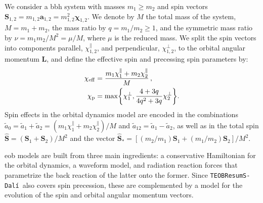 \documentclass[prd,amssymb,amsmath,amsfonts,nofootinbib,reprint,showpacs,longbibliography]{revtex4-1}
\newcommand{\mbf}[1]{\mathbf{#1}}
\newcommand{\dali}[0]{\texttt{TEOBResumS-Dalí}}
\begin{document}
We consider a \ac{bbh} system with masses $m_1 \geq m_2$ and spin vectors $\mbf{S}_{1,2} = m_{1,2} \bm{a}_{1,2} =
m_{1,2}^2 \bm{\chi}_{1,2}$. We denote by $M$ the total mass of the system, $M = m_1 + m_2$, the mass ratio
by $q = m_1/m_2 \geq 1$, and the symmetric mass ratio by $\nu = m_1m_2/M^2 = \mu/M$, where $\mu$ is the reduced
mass. We split the spin vectors into components parallel, $\chi_{1,2}^{\parallel}$, and perpendicular,
$\chi_{1,2}^{\perp}$, to the orbital angular momentum $\bm{L}$, and define the effective spin and precessing spin
parameters by:
\begin{subequations}
\begin{align}
\chi_{\rm eff} &= \frac{m_1 \chi_1^{\parallel} + m_2 \chi_2^{\parallel}}{M} \, , \\
\chi_{\rm p}   &= \max \biggl\{ \chi_1^\perp, \dfrac{4+3q}{4q^2+3q} \chi_2^\perp \biggr\}.
\end{align}
\end{subequations}
Spin effects in the orbital dynamics model are encoded in the combinations $\tilde{a}_0 = \tilde{a}_1 +
\tilde{a}_2 = (m_1\chi_1^\parallel + m_2 \chi_2^\parallel)/M$ and $\tilde{a}_{12} = \tilde{a}_1 - \tilde{a}_2$,
as well as in the total spin $\hat{\bm{S}} = (\bm{S}_1 + \bm{S}_2)/M^2$ and the vector $\hat{\bm{S}}_* = 
\left[(m_2/m_1) \bm{S}_1 + (m_1/m_2) \bm{S}_2\right]/M^2$.

\ac{eob} models are built from three main ingredients: a conservative Hamiltonian for the orbital dynamics,
a waveform model, and radiation reaction forces that parametrize the back reaction of the latter onto the former.
Since \dali~also covers spin precession, these are complemented by a model for the evolution of the spin
and orbital angular momentum vectors.
\end{document}
